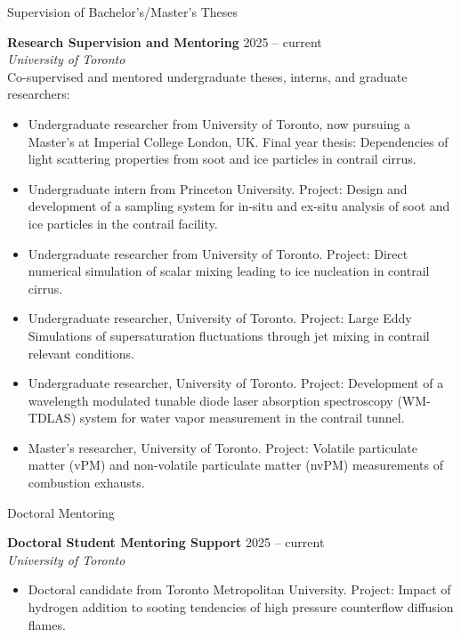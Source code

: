 \documentclass[11pt,a4paper]{article}
\begin{document}
	
	\begin{sectionbanner}{Supervision of Bachelor's/Master's Theses}
	\end{sectionbanner}
	\noindent\textbf{Research Supervision and Mentoring} \hfill 2025 -- current \\
	\emph{University of Toronto} \\
	Co-supervised and mentored undergraduate theses, interns, and graduate researchers:
	\begin{itemize}
		\item Undergraduate researcher from University of Toronto, now pursuing a Master's at Imperial College London, UK. Final year thesis: Dependencies of light scattering properties from soot and ice particles in contrail cirrus.
		\item Undergraduate intern from Princeton University. Project: Design and development of a sampling system for in-situ and ex-situ analysis of soot and ice particles in the contrail facility.
		\item Undergraduate researcher from University of Toronto. Project: Direct numerical simulation of scalar mixing leading to ice nucleation in contrail cirrus.
		\item Undergraduate researcher, University of Toronto. Project: Large Eddy Simulations of supersaturation fluctuations through jet mixing in contrail relevant conditions.
		\item Undergraduate researcher, University of Toronto. Project: Development of a wavelength modulated tunable diode laser absorption spectroscopy (WM-TDLAS) system for water vapor measurement in the contrail tunnel.
		\item Master's researcher, University of Toronto. Project: Volatile particulate matter (vPM) and non-volatile particulate matter (nvPM) measurements of combustion exhausts.
	\end{itemize}
	
	
	\begin{sectionbanner}{Doctoral Mentoring}
	\end{sectionbanner}
	\noindent\textbf{Doctoral Student Mentoring Support} \hfill 2025 -- current \\
	\emph{University of Toronto}
	\begin{itemize}
		\item Doctoral candidate from Toronto Metropolitan University. Project: Impact of hydrogen addition to sooting tendencies of high pressure counterflow diffusion flames.
	\end{itemize}
	
\end{document}
